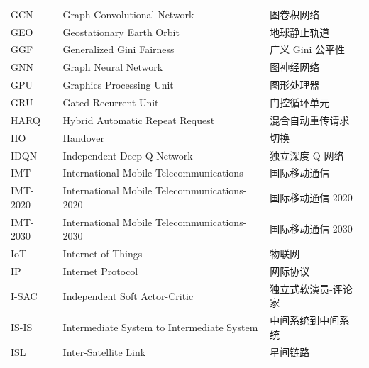 \begin{abbreviation}
\begin{longtable}{@{} p{} p{} p{} @{}}
  GCN       & Graph Convolutional Network                                     & 图卷积网络                    \\
  GEO       & Geostationary Earth Orbit                                       & 地球静止轨道                  \\
  GGF       & Generalized Gini Fairness                                       & 广义 Gini 公平性              \\
  GNN       & Graph Neural Network                                            & 图神经网络                    \\
  GPU       & Graphics Processing Unit                                        & 图形处理器                    \\
  GRU       & Gated Recurrent Unit                                            & 门控循环单元                  \\
  HARQ      & Hybrid Automatic Repeat Request                                 & 混合自动重传请求              \\
  HO        & Handover                                                        & 切换                          \\
  IDQN      & Independent Deep Q-Network                                      & 独立深度 Q 网络               \\
  IMT       & International Mobile Telecommunications                         & 国际移动通信                  \\
  IMT-2020  & International Mobile Telecommunications-2020                    & 国际移动通信 2020             \\
  IMT-2030  & International Mobile Telecommunications-2030                    & 国际移动通信 2030             \\
  IoT       & Internet of Things                                              & 物联网                        \\
  IP        & Internet Protocol                                               & 网际协议                      \\
  I-SAC     & Independent Soft Actor-Critic                                   & 独立式软演员-评论家           \\
  IS-IS     & Intermediate System to Intermediate System                     & 中间系统到中间系统            \\
  ISL       & Inter-Satellite Link                                            & 星间链路                      \\

\end{longtable}
\end{abbreviation}
